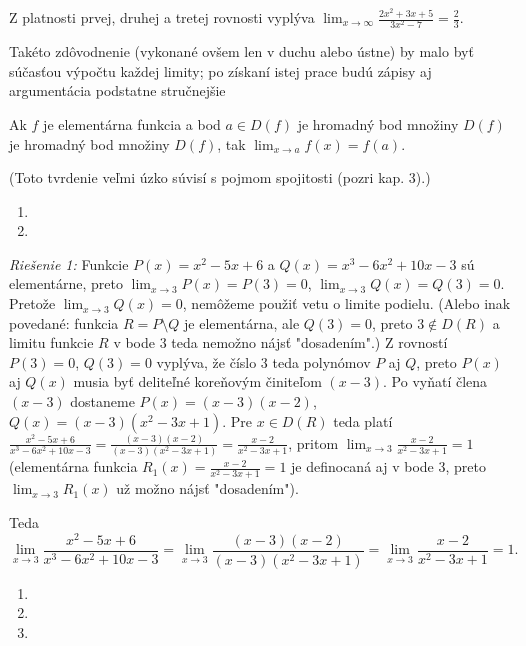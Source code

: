 Z platnosti prvej, druhej a tretej rovnosti vyplýva $\lim_{x \rightarrow \infty} \frac{2x^2+3x+5}{3x^2-7}=\frac{2}{3}$.

Takéto zdôvodnenie (vykonané ovšem len v duchu alebo ústne) by malo byť súčasťou výpočtu každej limity; po získaní istej prace budú zápisy aj argumentácia podstatne stručnejšie

\begin{veta}
Ak $f$ je elementárna funkcia a bod $a \in D(f)$ je hromadný bod množiny $D(f)$ je hromadný bod množiny $D(f)$, tak $\lim_{x \rightarrow a} f(x)=f(a)$.
\end{veta}

(Toto tvrdenie veľmi úzko súvisí s pojmom spojitosti (pozri kap. 3).)

\begin{enumerate}[resume]
	\item {}
	\item {}
\end{enumerate}

\textit{Riešenie 1:}
Funkcie $P(x)=x^2-5x+6$ a $Q(x)=x^3-6x^2+10x-3$ sú elementárne, preto $\lim_{x \rightarrow 3} P(x)=P(3)=0$, $\lim_{x \rightarrow 3} Q(x)=Q(3)=0$. Pretože $\lim_{x \rightarrow 3} Q(x)=0$, nemôžeme použiť vetu o limite podielu. (Alebo inak povedané: funkcia $R=P \setminus Q$ je elementárna, ale $Q(3)=0$, preto $3 \notin D(R)$ a limitu funkcie $R$ v bode $3$ teda nemožno nájsť "dosadením".) Z rovností $P(3)=0$, $Q(3)=0$ vyplýva, že číslo $3$ teda polynómov $P$ aj $Q$, preto $P(x)$ aj $Q(x)$ musia byť deliteľné koreňovým činiteľom $(x-3)$. Po vyňatí člena $(x-3)$ dostaneme $P(x)=(x-3)(x-2)$, $Q(x)=(x-3)(x^2-3x+1)$. Pre $x \in D(R)$ teda platí $\frac{x^2-5x+6}{x^3-6x^2+10x-3}=\frac{(x-3)(x-2)}{(x-3)(x^2-3x+1)}=\frac{x-2}{x^2-3x+1}$, pritom $\lim_{x \rightarrow 3} \frac{x-2}{x^2-3x+1}=1$ (elementárna funkcia $R_1(x)=\frac{x-2}{x^2-3x+1}=1$ je definocaná aj v bode $3$, preto $\lim_{x \rightarrow 3} R_1(x)$ už možno nájsť "dosadením").

Teda $$\lim_{x \rightarrow 3} \frac{x^2-5x+6}{x^3-6x^2+10x-3}=\lim_{x \rightarrow 3} \frac{(x-3)(x-2)}{(x-3)(x^2-3x+1)}=\lim_{x \rightarrow 3} \frac{x-2}{x^2-3x+1}=1.$$

\begin{enumerate}[resume]
	\item {}
	\item {}
	\item {}
\end{enumerate}

